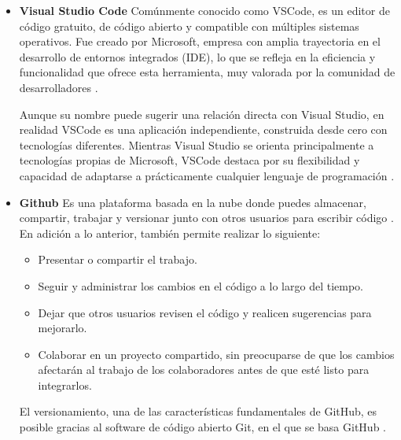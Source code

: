 \begin{itemize}	
	
	\item\textbf{Visual Studio Code} Comúnmente conocido como VSCode, es un editor de código gratuito, de código abierto y compatible con múltiples sistemas operativos. Fue creado por Microsoft, empresa con amplia trayectoria en el desarrollo de entornos integrados (IDE), lo que se refleja en la eficiencia y funcionalidad que ofrece esta herramienta, muy valorada por la comunidad de desarrolladores \cite{cimas2024vscode}.
	
	
	
	Aunque su nombre puede sugerir una relación directa con Visual Studio, en realidad VSCode es una aplicación independiente, construida desde cero con tecnologías diferentes. Mientras Visual Studio se orienta principalmente a tecnologías propias de Microsoft, VSCode destaca por su flexibilidad y capacidad de adaptarse a prácticamente cualquier lenguaje de programación \cite{garcia2024vscode}.
	
	
	
	\item\textbf{Github} Es una plataforma basada en la nube donde puedes almacenar, compartir, trabajar y versionar junto con otros usuarios para escribir código \cite{github2025about}. En adición a lo anterior, también permite realizar lo siguiente:
	
	
	
	\begin{itemize}
		
		\item Presentar o compartir el trabajo.
		
		\item Seguir y administrar los cambios en el código a lo largo del tiempo.
		
		\item Dejar que otros usuarios revisen el código y realicen sugerencias para mejorarlo.
		
		\item Colaborar en un proyecto compartido, sin preocuparse de que los cambios afectarán al trabajo de los colaboradores antes de que esté listo para integrarlos.
		
	\end{itemize}
	
	
	
	El versionamiento, una de las características fundamentales de GitHub, es posible gracias al software de código abierto Git, en el que se basa GitHub \cite{github2025about}.
	

\end{itemize}
